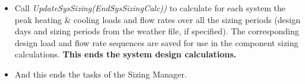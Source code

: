 \begin{itemize}
\item
  Call \emph{UpdateSysSizing(EndSysSizingCalc))} to calculate for each system the peak heating \& cooling loads and flow rates over all the sizing periods (design days and sizing periods from the weather file, if specified). The corresponding design load and flow rate sequences are saved for use in the component sizing calculations. \textbf{This ends the system design calculations.}
\item
  And this ends the tasks of the Sizing Manager.
\end{itemize}
